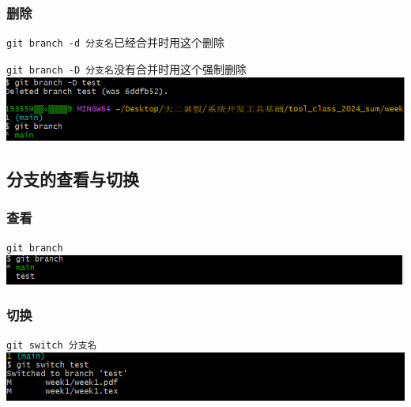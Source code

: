 \documentclass[UTF8]{ctexart}
\begin{document}
\subsubsection{删除}
\verb|git branch -d 分支名|\quad 已经合并时用这个删除 \par
\verb|git branch -D 分支名|\quad 没有合并时用这个强制删除\\
\includegraphics[width=1\textwidth]{delete.png}

\subsection{分支的查看与切换}
\subsubsection{查看}
\verb|git branch|\\
\includegraphics[width=1\textwidth]{branch.png}
\subsubsection{切换}
\verb|git switch 分支名|\\
\includegraphics[width=1\textwidth]{switch.png}
\end{document}
